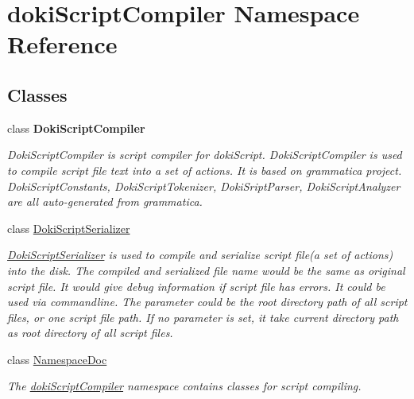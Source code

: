 \hypertarget{namespacedoki_script_compiler}{}\section{doki\+Script\+Compiler Namespace Reference}
\label{namespacedoki_script_compiler}
\subsection*{Classes}
\begin{DoxyCompactItemize}
\item 
class {\bfseries Doki\+Script\+Compiler}
\begin{DoxyCompactList}\small\item\em Doki\+Script\+Compiler is script compiler for doki\+Script. Doki\+Script\+Compiler is used to compile script file text into a set of actions. It is based on grammatica project. Doki\+Script\+Constants, Doki\+Script\+Tokenizer, Doki\+Sript\+Parser, Doki\+Script\+Analyzer are all auto-\/generated from grammatica. \end{DoxyCompactList}\item 
class \hyperlink{classdoki_script_compiler_1_1_doki_script_serializer}{Doki\+Script\+Serializer}
\begin{DoxyCompactList}\small\item\em \hyperlink{classdoki_script_compiler_1_1_doki_script_serializer}{Doki\+Script\+Serializer} is used to compile and serialize script file(a set of actions) into the disk. The compiled and serialized file name would be the same as original script file. It would give debug information if script file has errors. It could be used via commandline. The parameter could be the root directory path of all script files, or one script file path. If no parameter is set, it take current directory path as root directory of all script files. \end{DoxyCompactList}\item 
class \hyperlink{classdoki_script_compiler_1_1_namespace_doc}{Namespace\+Doc}
\begin{DoxyCompactList}\small\item\em The \hyperlink{namespacedoki_script_compiler}{doki\+Script\+Compiler} namespace contains classes for script compiling. \end{DoxyCompactList}\end{DoxyCompactItemize}
